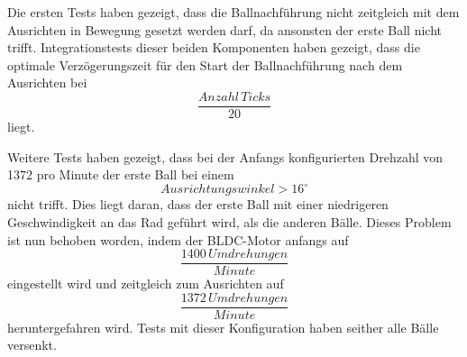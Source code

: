 Die ersten Tests haben gezeigt, dass die Ballnachführung nicht zeitgleich mit dem Ausrichten in Bewegung gesetzt werden darf, da ansonsten der erste Ball nicht trifft. Integrationstests dieser beiden Komponenten haben gezeigt, dass die optimale Verzögerungszeit für den Start der Ballnachführung nach dem Ausrichten bei \[\frac{Anzahl\,Ticks}{20}\] liegt. 

Weitere Tests haben gezeigt, dass bei der Anfangs konfigurierten Drehzahl von 1372 pro Minute der erste Ball bei einem \[Ausrichtungswinkel > 16^\circ\] nicht trifft. Dies liegt daran, dass der erste Ball mit einer niedrigeren Geschwindigkeit an das Rad geführt wird, als die anderen Bälle. Dieses Problem ist nun behoben worden, indem der BLDC-Motor anfangs auf \[\frac{1400\,Umdrehungen}{Minute}\] eingestellt wird und zeitgleich zum Ausrichten auf \[\frac{1372\,Umdrehungen}{Minute}\] heruntergefahren wird. Tests mit dieser Konfiguration haben seither alle Bälle versenkt.